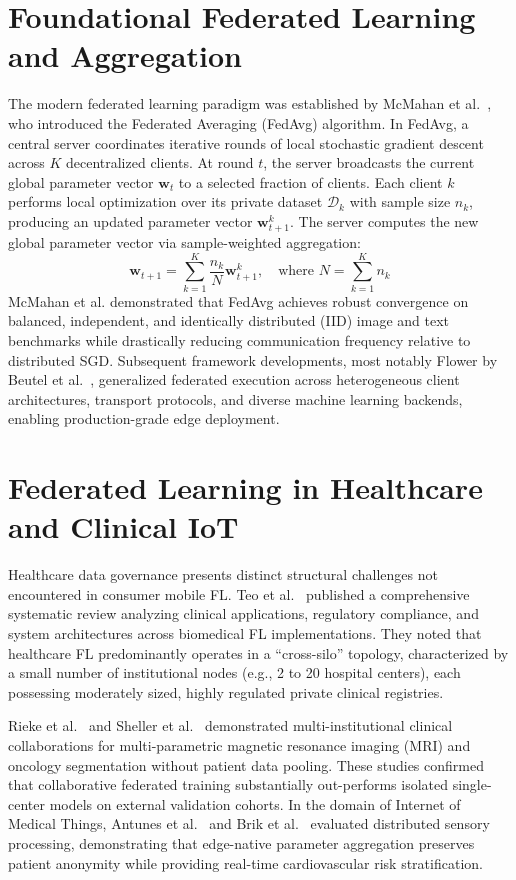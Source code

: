 \documentclass[12pt,a4paper,oneside]{report}
\begin{document}
\section{Foundational Federated Learning and Aggregation}
The modern federated learning paradigm was established by McMahan et al.~\cite{mcmahan2017communication}, who introduced the Federated Averaging (FedAvg) algorithm. In FedAvg, a central server coordinates iterative rounds of local stochastic gradient descent across $K$ decentralized clients. At round $t$, the server broadcasts the current global parameter vector $\mathbf{w}_t$ to a selected fraction of clients. Each client $k$ performs local optimization over its private dataset $\mathcal{D}_k$ with sample size $n_k$, producing an updated parameter vector $\mathbf{w}_{t+1}^k$. The server computes the new global parameter vector via sample-weighted aggregation:
\begin{equation}
    \mathbf{w}_{t+1} = \sum_{k=1}^{K} \frac{n_k}{N} \mathbf{w}_{t+1}^k, \quad \text{where } N = \sum_{k=1}^{K} n_k
    \label{eq:fedavg}
\end{equation}
McMahan et al. demonstrated that FedAvg achieves robust convergence on balanced, independent, and identically distributed (IID) image and text benchmarks while drastically reducing communication frequency relative to distributed SGD. Subsequent framework developments, most notably Flower by Beutel et al.~\cite{beutel2020flower}, generalized federated execution across heterogeneous client architectures, transport protocols, and diverse machine learning backends, enabling production-grade edge deployment.

\section{Federated Learning in Healthcare and Clinical IoT}
Healthcare data governance presents distinct structural challenges not encountered in consumer mobile FL. Teo et al.~\cite{teo2024federated} published a comprehensive systematic review analyzing clinical applications, regulatory compliance, and system architectures across biomedical FL implementations. They noted that healthcare FL predominantly operates in a ``cross-silo'' topology, characterized by a small number of institutional nodes (e.g., 2 to 20 hospital centers), each possessing moderately sized, highly regulated private clinical registries.

Rieke et al.~\cite{rieke2020future} and Sheller et al.~\cite{sheller2020federated} demonstrated multi-institutional clinical collaborations for multi-parametric magnetic resonance imaging (MRI) and oncology segmentation without patient data pooling. These studies confirmed that collaborative federated training substantially out-performs isolated single-center models on external validation cohorts. In the domain of Internet of Medical Things, Antunes et al.~\cite{antunes2022federated} and Brik et al.~\cite{brik2024secure} evaluated distributed sensory processing, demonstrating that edge-native parameter aggregation preserves patient anonymity while providing real-time cardiovascular risk stratification.
\end{document}
